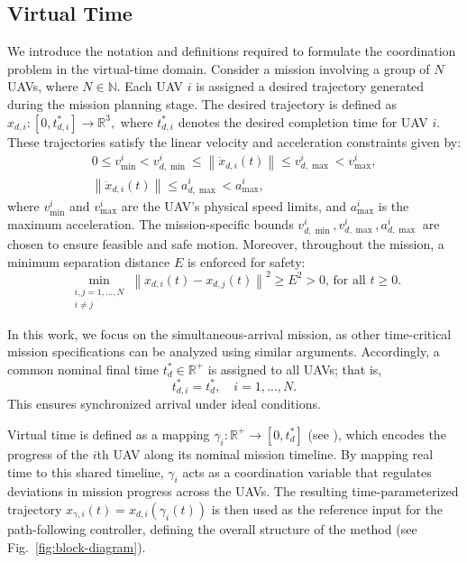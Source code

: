 \documentclass[letterpaper,journal]{IEEEtran}
\begin{document}
\subsection{Virtual Time}\label{path-planning-and-assumptions}
 
We introduce the notation and definitions required to formulate the coordination problem in the virtual-time domain.
Consider a mission involving a group of $N$ UAVs, where $N \in \mathbb{N}$. Each UAV $i$ is assigned a desired trajectory generated during the mission planning stage. The desired trajectory is defined as
$
x_{d,i} : [0, t^*_{d,i}] \rightarrow \mathbb{R}^3,
$
where $t^*_{d,i}$ denotes the desired completion time for UAV $i$. These trajectories satisfy the linear velocity and acceleration constraints given by:
\begin{equation} \label{eq:dyn_constraints}
\begin{split}
0 \leq v^i_{\min} < v^i_{d,\min} \leq \left\| \dot{x}_{d,i}(t) \right\| \leq v^i_{d,\max} < v^i_{\max}, \\
\left\| \ddot{x}_{d,i}(t) \right\| \leq a^i_{d,\max} < a^i_{\max},
\end{split}
\end{equation}
where $v^i_{\min}$ and $v^i_{\max}$ are the UAV’s physical speed limits, and $a^i_{\max}$ is the maximum acceleration. The mission-specific bounds $v^i_{d,\min}, v^i_{d,\max}, a^i_{d,\max}$ are chosen to ensure feasible and safe motion. Moreover, throughout the mission, a minimum separation distance $E$ is enforced for safety: \begin{equation}\label{def-sp-sep}
\min _{\substack{i, j=1, \ldots, N \\ i \neq j}}\left\|x_{d, i}(t)-x_{d, j}(t)\right\|^2 \geq E^2>0, \,\text{for all } t\geq 0. 
\end{equation} 

In this work, we focus on the simultaneous-arrival mission, as other time-critical mission specifications can be analyzed using similar arguments. Accordingly, a common nominal final time $t_d^* \in \mathbb{R}^+$ is assigned to all UAVs; that is,
\begin{equation}
t_{d,i}^* = t_d^*, \quad i = 1, \ldots, N.
\end{equation}
This ensures synchronized arrival under ideal conditions.

Virtual time is defined as a mapping $\gamma_i: \mathbb{R}^{+} \rightarrow [0, t_d^*]$ (see \cite{7065327,kaminer2017time}), which encodes the progress of the $i$th UAV along its nominal mission timeline. By mapping real time to this shared timeline, $\gamma_i$ acts as a coordination variable that regulates deviations in mission progress across the UAVs. The resulting time-parameterized trajectory $x_{\gamma,i}(t)=x_{d,i}(\gamma_i(t))$ is then used as the reference input for the path-following controller, defining the overall structure of the method (see Fig.~\ref{fig:block-diagram}).
\end{document}
